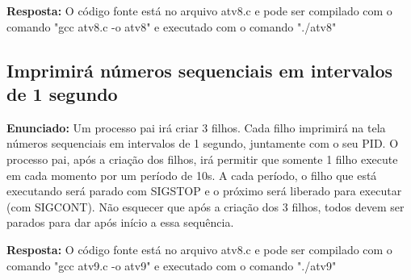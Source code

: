 \documentclass{article}
\begin{document}
\textbf{Resposta:} O código fonte está no arquivo atv8.c e pode ser compilado com o comando "gcc atv8.c -o atv8" e executado com o comando "./atv8"

\subsection{Imprimirá números sequenciais em intervalos de 1 segundo}
\textbf{Enunciado:} Um processo pai irá criar 3 filhos. Cada filho imprimirá na tela números sequenciais em intervalos de 1 segundo, juntamente com o seu PID. O processo pai, após a criação dos filhos, irá permitir que somente 1 filho execute em cada momento por um período de 10s. A cada período, o filho que está executando será parado com SIGSTOP e o próximo será liberado para executar (com SIGCONT). Não esquecer que após a criação dos 3 filhos, todos devem ser parados para dar após início a essa sequência.\newline

\textbf{Resposta:} O código fonte está no arquivo atv8.c e pode ser compilado com o comando "gcc atv9.c -o atv9" e executado com o comando "./atv9"

\printbibliography %
\end{document}

